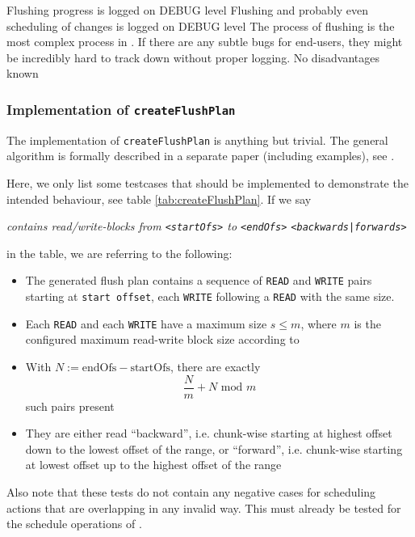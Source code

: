 {%
Flushing progress is logged on DEBUG level
}
{%
Flushing and probably even scheduling of changes is logged on DEBUG level
}
{%
The process of flushing is the most complex process in \COMPmedia{}. If there are any subtle bugs for end-users, they might be incredibly hard to track down without proper logging.
}
{%
No disadvantages known
}


\subsubsection{Implementation of \texttt{createFlushPlan}}
\label{sec:flushingPlan}

The implementation of \texttt{createFlushPlan} is anything but trivial. The general algorithm is formally described in a separate paper (including examples), see \cite{CFPPaper}.

Here, we only list some testcases that should be implemented to demonstrate the intended behaviour, see table \ref{tab:createFlushPlan}. If we say

\emph{contains read/write-blocks from \texttt{<startOfs>} to \texttt{<endOfs>} \texttt{<backwards|forwards>}}

in the table, we are referring to the following:
\begin{itemize}
\item The generated flush plan contains a sequence of \texttt{READ} and \texttt{WRITE} pairs starting at \texttt{start offset}, each \texttt{WRITE} following a \texttt{READ} with the same size.
\item Each \texttt{READ} and each \texttt{WRITE} have a maximum size $s\leq m$, where $m$ is the configured maximum read-write block size according to 
\item With $N:=\text{endOfs} - \text{startOfs}$, there are exactly \[\frac{N}{m}+N\text{ mod }m\] such pairs present
\item They are either read ``backward'', i.e. chunk-wise starting at highest offset down to the lowest offset of the range, or ``forward'', i.e. chunk-wise starting at lowest offset up to the highest offset of the range
\end{itemize}

Also note that these tests do not contain any negative cases for scheduling actions that are overlapping in any invalid way. This must already be tested for the schedule operations of \MediumChangeManager{}.

